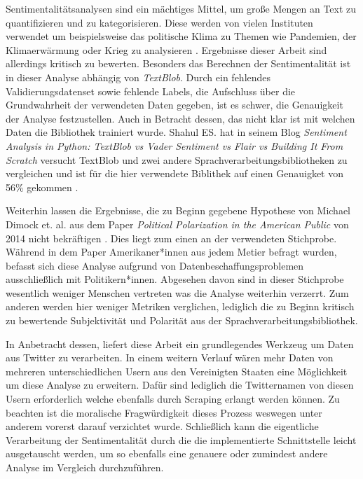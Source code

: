 Sentimentalitätsanalysen sind ein mächtiges Mittel, um große Mengen an Text zu quantifizieren und zu kategorisieren. Diese werden von vielen Instituten verwendet um beispielsweise das politische Klima zu Themen wie Pandemien, der Klimaerwärmung oder Krieg zu analysieren . Ergebnisse dieser Arbeit sind allerdings kritisch zu bewerten. Besonders das Berechnen der Sentimentalität ist in dieser Analyse abhängig von \textit{TextBlob}. Durch ein fehlendes Validierungsdatenset sowie fehlende Labels, die Aufschluss über die Grundwahrheit der verwendeten Daten gegeben, ist es schwer, die Genauigkeit der Analyse festzustellen. Auch in Betracht dessen, das nicht klar ist mit welchen Daten die Bibliothek trainiert wurde. Shahul ES. hat in seinem Blog \textit{Sentiment Analysis in Python: TextBlob vs Vader Sentiment vs Flair vs Building It From Scratch} versucht TextBlob und zwei andere Sprachverarbeitungsbibliotheken zu vergleichen und ist für die hier verwendete Biblithek auf einen Genauigket von 56\% gekommen .

Weiterhin lassen die Ergebnisse, die zu Beginn gegebene Hypothese von Michael Dimock et. al. aus dem Paper \textit{Political Polarization in the American Public} von 2014 nicht bekräftigen \label{polPolar} . Dies liegt zum einen an der verwendeten Stichprobe. Während in dem Paper Amerikaner*innen aus jedem Metier befragt wurden, befasst sich diese Analyse aufgrund von Datenbeschaffungsproblemen ausschließlich mit Politikern*innen. Abgesehen davon sind in dieser Stichprobe wesentlich weniger Menschen vertreten was die Analyse weiterhin verzerrt. Zum anderen werden hier weniger Metriken verglichen, lediglich die zu Beginn kritisch zu bewertende Subjektivität und Polarität aus der Sprachverarbeitungsbibliothek.

In Anbetracht dessen, liefert diese Arbeit ein grundlegendes Werkzeug um Daten aus Twitter zu verarbeiten. In einem weitern Verlauf wären mehr Daten von mehreren unterschiedlichen Usern aus den Vereinigten Staaten eine Möglichkeit um diese Analyse zu erweitern. Dafür sind lediglich die Twitternamen von diesen Usern erforderlich welche ebenfalls durch Scraping erlangt werden können. Zu beachten ist die moralische Fragwürdigkeit dieses Prozess weswegen unter anderem vorerst darauf verzichtet wurde. Schließlich kann die eigentliche Verarbeitung der Sentimentalität durch die die implementierte Schnittstelle leicht ausgetauscht werden, um so ebenfalls eine genauere oder zumindest andere Analyse im Vergleich durchzuführen.
